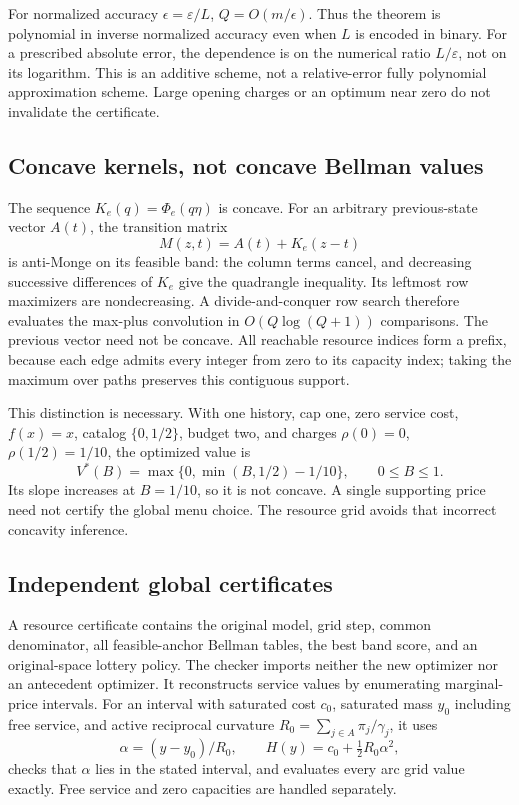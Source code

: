For normalized accuracy $\epsilon=\varepsilon/L$, $Q=O(m/\epsilon)$. Thus the theorem is polynomial in inverse normalized accuracy even when $L$ is encoded in binary. For a prescribed absolute error, the dependence is on the numerical ratio $L/\varepsilon$, not on its logarithm. This is an additive scheme, not a relative-error fully polynomial approximation scheme. Large opening charges or an optimum near zero do not invalidate the certificate.

\subsection{Concave kernels, not concave Bellman values}
The sequence $K_e(q)=\Phi_e(q\eta)$ is concave. For an arbitrary previous-state vector $A(t)$, the transition matrix
\[
 M(z,t)=A(t)+K_e(z-t)
\]
is anti-Monge on its feasible band: the column terms cancel, and decreasing successive differences of $K_e$ give the quadrangle inequality. Its leftmost row maximizers are nondecreasing. A divide-and-conquer row search therefore evaluates the max-plus convolution in $O(Q\log(Q+1))$ comparisons. The previous vector need not be concave. All reachable resource indices form a prefix, because each edge admits every integer from zero to its capacity index; taking the maximum over paths preserves this contiguous support.

This distinction is necessary. With one history, cap one, zero service cost, $f(x)=x$, catalog $\{0,1/2\}$, budget two, and charges $\rho(0)=0$, $\rho(1/2)=1/10$, the optimized value is
\[
 V^*(B)=\max\{0,\min(B,1/2)-1/10\},\qquad 0\leq B\leq1.
\]
Its slope increases at $B=1/10$, so it is not concave. A single supporting price need not certify the global menu choice. The resource grid avoids that incorrect concavity inference.

\subsection{Independent global certificates}
A resource certificate contains the original model, grid step, common denominator, all feasible-anchor Bellman tables, the best band score, and an original-space lottery policy. The checker imports neither the new optimizer nor an antecedent optimizer. It reconstructs service values by enumerating marginal-price intervals. For an interval with saturated cost $c_0$, saturated mass $y_0$ including free service, and active reciprocal curvature $R_0=\sum_{j\in A}\pi_j/\gamma_j$, it uses
\[
 \alpha=(y-y_0)/R_0,\qquad H(y)=c_0+\tfrac12R_0\alpha^2,
\]
checks that $\alpha$ lies in the stated interval, and evaluates every arc grid value exactly. Free service and zero capacities are handled separately.

